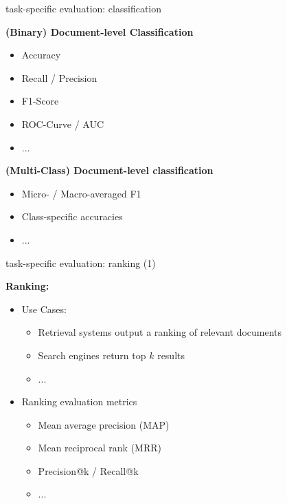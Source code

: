
\begin{vbframe}{task-specific evaluation: classification}

\vfill

\textbf{(Binary) Document-level Classification}

\begin{itemize}
	\item Accuracy
	\item Recall / Precision
	\item F1-Score
	\item ROC-Curve / AUC
	\item ...
\end{itemize}

\textbf{(Multi-Class) Document-level classification}

\begin{itemize}
	\item Micro- / Macro-averaged F1
	\item Class-specific accuracies
	\item ...
\end{itemize}
\vfill

\end{vbframe}


\begin{vbframe}{task-specific evaluation: ranking (1)}

\vfill

\textbf{Ranking:}

\begin{itemize}
		\item Use Cases:
				\begin{itemize}
					\item Retrieval systems output a ranking of relevant documents
					\item Search engines return top $k$ results
					\item ...
				\end{itemize}
		\item Ranking evaluation metrics
				\begin{itemize}
					\item Mean average precision (MAP)
					\item Mean reciprocal rank (MRR)
					\item Precision@k / Recall@k
					\item ...
				\end{itemize}
\end{itemize}
\vfill

\end{vbframe}

